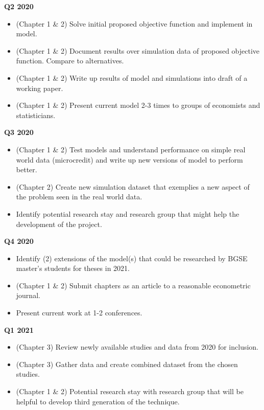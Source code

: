 \documentclass[a4paper,12pt]{article}
\begin{document}
\textbf{Q2 2020}

\begin{itemize}
\item (Chapter 1 \& 2) Solve initial proposed objective function and implement in model.
\item (Chapter 1 \& 2) Document results over simulation data of proposed objective function. Compare to alternatives.
\item (Chapter 1 \& 2) Write up results of model and simulations into draft of a working paper.
\item (Chapter 1 \& 2) Present current model 2-3 times to groups of economists and statisticians.
\end{itemize}


\textbf{Q3 2020}

\begin{itemize}
\item (Chapter 1 \& 2) Test models and understand performance on simple real world data (microcredit) and write up new versions of model to perform better.
\item (Chapter 2) Create new simulation dataset that exemplies a new aspect of the problem seen in the real world data.
\item Identify potential research stay and research group that might help the development of the project.
\end{itemize}


\textbf{Q4 2020}

\begin{itemize}
\item Identify (2) extensions of the model(s) that could be researched by BGSE master’s students for theses in 2021.
\item (Chapter 1 \& 2) Submit chapters as an article to a reasonable econometric journal.
\item Present current work at 1-2 conferences.
\end{itemize}

\textbf{Q1 2021}

\begin{itemize}
\item (Chapter 3) Review newly available studies and data from 2020 for inclusion.
\item (Chapter 3) Gather data and create combined dataset from the chosen studies.
\item (Chapter 1 \& 2) Potential research stay with research group that will be helpful to develop third generation of the technique.
\end{itemize}
\end{document}
